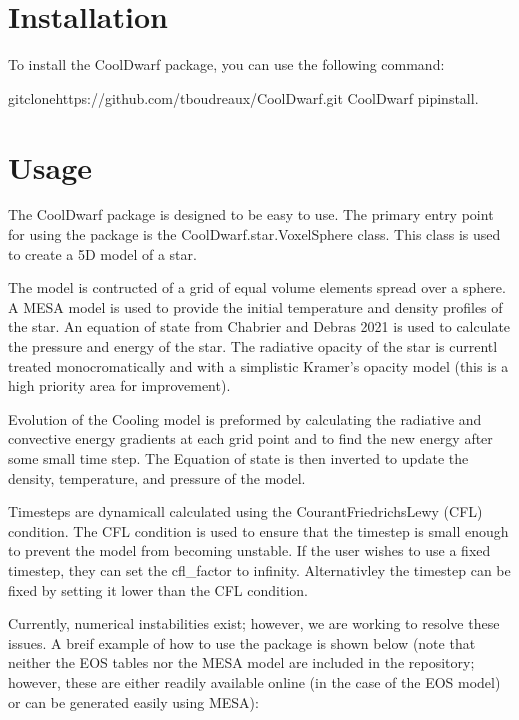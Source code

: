 \documentclass[letterpaper,10pt,english]{sphinxmanual}
\begin{document}
\chapter{Installation}
\label{\detokenize{index:installation}}
\sphinxAtStartPar
To install the CoolDwarf package, you can use the following command:

\begin{sphinxVerbatim}[commandchars=\\\{\}]
gitclonehttps://github.com/tboudreaux/CoolDwarf.git
CoolDwarf
pipinstall.
\end{sphinxVerbatim}


\chapter{Usage}
\label{\detokenize{index:usage}}
\sphinxAtStartPar
The CoolDwarf package is designed to be easy to use. The primary entry point for
using the package is the CoolDwarf.star.VoxelSphere class. This class is used to create a 5D
model of a star.

\sphinxAtStartPar
The model is contructed of a grid of equal volume elements spread over a sphere. A MESA model
is used to provide the initial temperature and density profiles of the star. An equation of state
from Chabrier and Debras 2021 is used to calculate the pressure and energy of the star. The radiative opacity
of the star is currentl treated monocromatically and with a simplistic Kramer’s opacity model (this is a high
priority area for improvement).

\sphinxAtStartPar
Evolution of the Cooling model is preformed by calculating the radiative and convective energy gradients
at each grid point and to find the new energy after some small time step. The Equation of state is then inverted
to update the density, temperature, and pressure of the model.

\sphinxAtStartPar
Timesteps are dynamicall calculated using the Courant\sphinxhyphen{}Friedrichs\sphinxhyphen{}Lewy (CFL) condition. The CFL condition is used to ensure
that the timestep is small enough to prevent the model from becoming unstable. If the user wishes to use a fixed timestep,
they can set the cfl\_factor to infinity. Alternativley the timestep can be fixed by setting it lower than the CFL condition.

\sphinxAtStartPar
Currently, numerical instabilities exist; however, we are working to resolve these issues. A breif example
of how to use the package is shown below (note that neither the EOS tables nor the MESA model are included in the
repository; however, these are either readily available online (in the case of the EOS model) or can be generated
easily using MESA):
\end{document}
